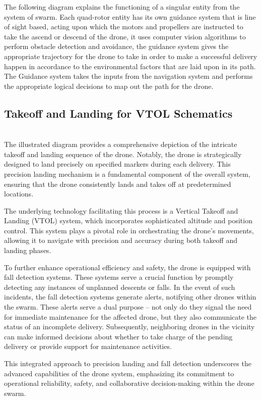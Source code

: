 \documentclass[preprint,12pt]{elsarticle}
\begin{document}
The following diagram explains the functioning of a singular entity from the system of swarm. Each quad-rotor entity has its own guidance system that is line of sight based, acting upon which the motors and propellers are instructed to take the ascend or descend of the drone, it uses computer vision algorithms to perform obstacle detection and avoidance, the guidance system gives the appropriate trajectory for the drone to take in order to make a successful delivery happen in accordance to the environmental factors that are laid upon in its path. The Guidance system takes the inputs from the navigation system and performs the appropriate logical decisions to map out the path for the drone.\\

\subsection{Takeoff and Landing for VTOL Schematics}\\
The illustrated diagram provides a comprehensive depiction of the intricate takeoff and landing sequence of the drone. Notably, the drone is strategically designed to land precisely on specified markers during each delivery. This precision landing mechanism is a fundamental component of the overall system, ensuring that the drone consistently lands and takes off at predetermined locations.

The underlying technology facilitating this process is a Vertical Takeoff and Landing (VTOL) system, which incorporates sophisticated altitude and position control. This system plays a pivotal role in orchestrating the drone's movements, allowing it to navigate with precision and accuracy during both takeoff and landing phases.

To further enhance operational efficiency and safety, the drone is equipped with fall detection systems. These systems serve a crucial function by promptly detecting any instances of unplanned descents or falls. In the event of such incidents, the fall detection systems generate alerts, notifying other drones within the swarm. These alerts serve a dual purpose – not only do they signal the need for immediate maintenance for the affected drone, but they also communicate the status of an incomplete delivery. Subsequently, neighboring drones in the vicinity can make informed decisions about whether to take charge of the pending delivery or provide support for maintenance activities.

This integrated approach to precision landing and fall detection underscores the advanced capabilities of the drone system, emphasizing its commitment to operational reliability, safety, and collaborative decision-making within the drone swarm.
\end{document}
